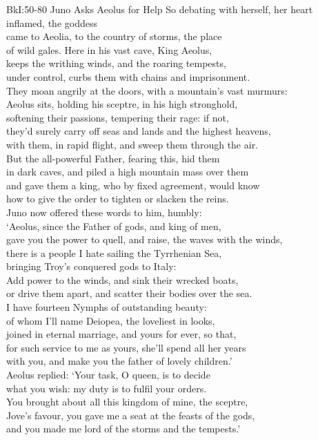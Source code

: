 \documentclass[12pt, a5paper]{minimal}
\begin{document}
{BkI:50-80 Juno Asks Aeolus for Help} 
So debating with herself, her heart inflamed, the goddess\\
came to Aeolia, to the country of storms, the place\\
of wild gales. Here in his vast cave, King Aeolus,\\
keeps the writhing winds, and the roaring tempests,\\
under control, curbs them with chains and imprisonment.\\
They moan angrily at the doors, with a mountain's vast murmurs:\\
Aeolus sits, holding his sceptre, in his high stronghold,\\
softening their passions, tempering their rage: if not,\\
they'd surely carry off seas and lands and the highest heavens,\\
with them, in rapid flight, and sweep them through the air.\\
But the all-powerful Father, fearing this, hid them\\
in dark caves, and piled a high mountain mass over them\\
and gave them a king, who by fixed agreement, would know\\
how to give the order to tighten or slacken the reins.\\
Juno now offered these words to him, humbly:\\
`Aeolus, since the Father of gods, and king of men,\\
gave you the power to quell, and raise, the waves with the winds,\\
there is a people I hate sailing the Tyrrhenian Sea,\\
bringing Troy's conquered gods to Italy:\\
Add power to the winds, and sink their wrecked boats,\\
or drive them apart, and scatter their bodies over the sea.\\
I have fourteen Nymphs of outstanding beauty:\\
of whom I'll name Deiopea, the loveliest in looks,\\
joined in eternal marriage, and yours for ever, so that,\\
for such service to me as yours, she'll spend all her years\\
with you, and make you the father of lovely children.'\\
Aeolus replied: `Your task, O queen, is to decide\\
what you wish: my duty is to fulfil your orders.\\
You brought about all this kingdom of mine, the sceptre,\\
Jove's favour, you gave me a seat at the feasts of the gods,\\
and you made me lord of the storms and the tempests.'
\end{document}
